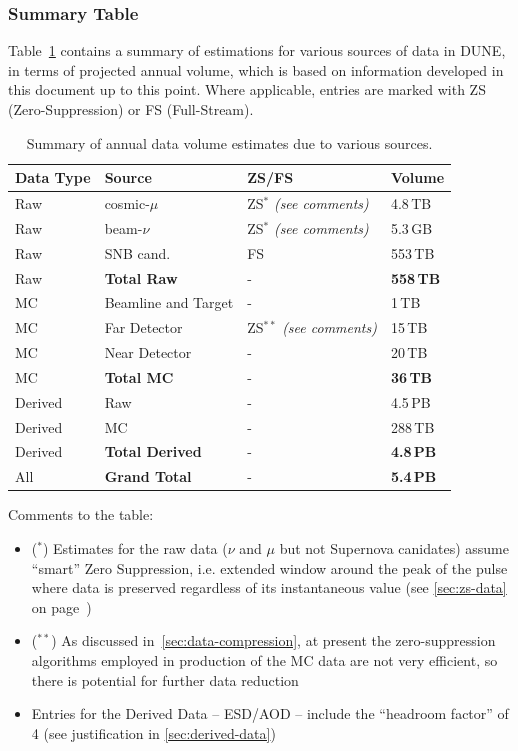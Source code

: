 \subsubsection{Summary Table}
Table~\ref{tab:summary-data-table} contains a summary of estimations for various sources
of data in DUNE, in terms of projected annual volume, which is based on information developed in
this document up to this point. Where applicable, entries are marked with ZS (Zero-Suppression) or
FS (Full-Stream).
\begin{table}[ht!]
	\centering
	\begin{tabular}{| p{1.56in}| p{1.5in} | p{1.5in} | p{1.2in} |}
		\hline
		\textbf{Data Type} & \textbf{Source} & \textbf{ZS/FS} & \textbf{Volume} \\ \hline
		Raw & cosmic-$\mu$  & ZS$^*$ \textit{(see comments)}& 4.8\,TB \\	\hline
		Raw & beam-$\nu$  & ZS$^*$ \textit{(see comments)}& 5.3\,GB  \\	\hline
		Raw & SNB cand. & FS & 553\,TB \\	\hline \hline \hline
		Raw & \textbf{Total Raw} & - & \textbf{558\,TB} \\		\hline \hline \hline
		MC & Beamline and Target  & - & 1\,TB \\	\hline
		MC & Far Detector & ZS$^{**}$  \textit{(see comments)}  & 15\,TB \\		\hline
		MC & Near Detector & - &20\,TB \\ \hline \hline \hline
		MC & \textbf{Total MC} & - & \textbf{36\,TB} \\		\hline \hline \hline
		Derived &  Raw  & - & 4.5\,PB \\	\hline
		Derived &  MC  & - & 288\,TB \\	\hline  \hline \hline
		Derived & \textbf{Total Derived} & - & \textbf{4.8\,PB} \\		\hline \hline \hline
		All & \textbf{Grand Total} & - & \textbf{5.4\,PB} \\		\hline %
	\end{tabular}
	\caption{Summary of annual data volume estimates due to various sources.}
	\label{tab:summary-data-table}
\end{table}

Comments to the table:
\begin{itemize}
\item ($^*$) Estimates for the raw data ($\nu$ and $\mu$ but not Supernova canidates) assume ``smart'' Zero Suppression, i.e. extended
window around the peak of the pulse where data is preserved regardless of its instantaneous value (see \ref{sec:zs-data} on page~\pageref{sec:zs-data})

\item ($^{**}$) As discussed in~\ref{sec:data-compression}, at present the zero-suppression algorithms employed in production of the
MC data are not very efficient, so there is potential for further data reduction

\item Entries for the Derived Data -- ESD/AOD --  include the ``headroom factor'' of 4 (see justification in \ref{sec:derived-data})
\end{itemize}
